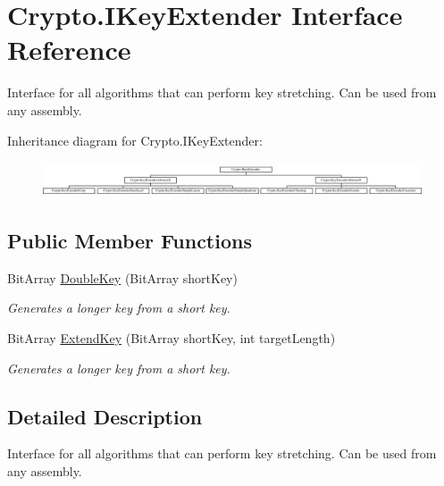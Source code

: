\hypertarget{interface_crypto_1_1_i_key_extender}{}\section{Crypto.\+I\+Key\+Extender Interface Reference}
\label{interface_crypto_1_1_i_key_extender}


Interface for all algorithms that can perform key stretching. Can be used from any assembly.  


Inheritance diagram for Crypto.\+I\+Key\+Extender\+:\begin{figure}[H]
\begin{center}
\leavevmode
\includegraphics[height=1.057269cm]{interface_crypto_1_1_i_key_extender}
\end{center}
\end{figure}
\subsection*{Public Member Functions}
\begin{DoxyCompactItemize}
\item 
Bit\+Array \hyperlink{interface_crypto_1_1_i_key_extender_a946f0bf735d90050a4ba5335ca920fd1}{Double\+Key} (Bit\+Array short\+Key)
\begin{DoxyCompactList}\small\item\em Generates a longer key from a short key. \end{DoxyCompactList}\item 
Bit\+Array \hyperlink{interface_crypto_1_1_i_key_extender_a0412d4d5b8d41546f9d6d126d3b4519f}{Extend\+Key} (Bit\+Array short\+Key, int target\+Length)
\begin{DoxyCompactList}\small\item\em Generates a longer key from a short key. \end{DoxyCompactList}\end{DoxyCompactItemize}


\subsection{Detailed Description}
Interface for all algorithms that can perform key stretching. Can be used from any assembly. 



